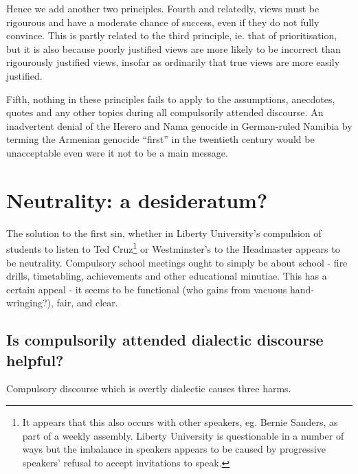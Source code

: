 \documentclass[10pt,a4paper]{article}
\begin{document}
\begin{multicols}{2}
	Hence we add another two principles. Fourth and relatedly, views must be
	rigourous and have a moderate chance of success, even if they do not
	fully convince. This is partly related to the third principle, ie. that
	of prioritisation, but it is also because poorly justified views are
	more likely to be incorrect than rigourously justified views, insofar as
	ordinarily that true views are more easily justified.
	
	Fifth, nothing in these principles fails to apply to the assumptions,
	anecdotes, quotes and any other topics during all compulsorily attended
	discourse. An inadvertent denial of the Herero and Nama genocide in
	German-ruled Namibia by terming the Armenian genocide ``first'' in the
	twentieth century would be unacceptable even were it not to be a main
	message.
	
	\section{Neutrality: a
		desideratum?}\label{neutrality-a-desideratum}
	
	The solution to the first sin, whether in Liberty University's
	compulsion of students to listen to Ted Cruz\footnote{It appears that
		this also occurs with other speakers, eg. Bernie Sanders, as part of a
		weekly assembly. Liberty University is questionable in a number of
		ways but the imbalance in speakers appears to be caused by progressive
		speakers' refusal to accept invitations to speak.} or Westminster's to
	the Headmaster appears to be neutrality. Compulsory school meetings
	ought to simply be about school - fire drills, timetabling, achievements
	and other educational minutiae. This has a certain appeal - it seems to
	be functional (who gains from vacuous hand-wringing?), fair, and clear.
	
	\subsection{Is compulsorily attended dialectic discourse
		helpful?}\label{is-compulsorily-attended-dialectic-discourse-helpful}
	
	Compulsory discourse which is overtly dialectic causes three harms.
	

\end{multicols}
\end{document}
